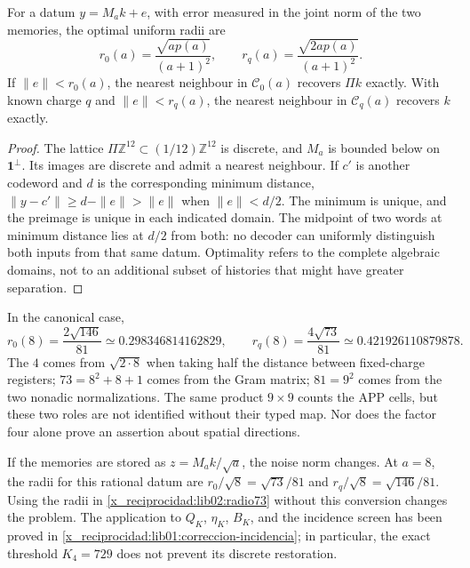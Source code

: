 \begin{theorem}
\label{x_reciprocidad:lib02:radios-memoria}
For a datum \(y=M_ak+e\), with error measured in the joint norm of the two memories, the optimal uniform radii are
\begin{equation}
 r_0(a)=\frac{\sqrt{ap(a)}}{(a+1)^2},\qquad
 r_q(a)=\frac{\sqrt{2ap(a)}}{(a+1)^2}.
 \label{x_reciprocidad:lib02:radios}
\end{equation}
If \(\|e\|<r_0(a)\), the nearest neighbour in \(\mathcal C_0(a)\) recovers \(\Pi k\) exactly. With known charge \(q\) and \(\|e\|<r_q(a)\), the nearest neighbour in \(\mathcal C_q(a)\) recovers \(k\) exactly.
\end{theorem}
\begin{proof}
The lattice \(\Pi\mathbb Z^{12}\subset(1/12)\mathbb Z^{12}\) is discrete, and \(M_a\) is bounded below on \(\mathbf1^\perp\). Its images are discrete and admit a nearest neighbour. If \(c'\) is another codeword and \(d\) is the corresponding minimum distance, \(\|y-c'\|\geq d-\|e\|>\|e\|\) when \(\|e\|<d/2\). The minimum is unique, and the preimage is unique in each indicated domain. The midpoint of two words at minimum distance lies at \(d/2\) from both: no decoder can uniformly distinguish both inputs from that same datum. Optimality refers to the complete algebraic domains, not to an additional subset of histories that might have greater separation.
\end{proof}

In the canonical case,
\begin{equation}
 r_0(8)=\frac{2\sqrt{146}}{81}\simeq0.298346814162829,
 \qquad
 r_q(8)=\frac{4\sqrt{73}}{81}\simeq0.421926110879878.
 \label{x_reciprocidad:lib02:radio73}
\end{equation}
The \(4\) comes from \(\sqrt{2\cdot8}\) when taking half the distance between fixed-charge registers; \(73=8^2+8+1\) comes from the Gram matrix; \(81=9^2\) comes from the two nonadic normalizations. The same product \(9\times9\) counts the APP cells, but these two roles are not identified without their typed map. Nor does the factor four alone prove an assertion about spatial directions.

If the memories are stored as \(z=M_ak/\sqrt a\), the noise norm changes. At \(a=8\), the radii for this rational datum are \(r_0/\sqrt8=\sqrt{73}/81\) and \(r_q/\sqrt8=\sqrt{146}/81\). Using the radii in \eqref{x_reciprocidad:lib02:radio73} without this conversion changes the problem. The application to \(Q_K\), \(\eta_K\), \(B_K\), and the incidence screen has been proved in \cref{x_reciprocidad:lib01:correccion-incidencia}; in particular, the exact threshold \(K_4=729\) does not prevent its discrete restoration.

